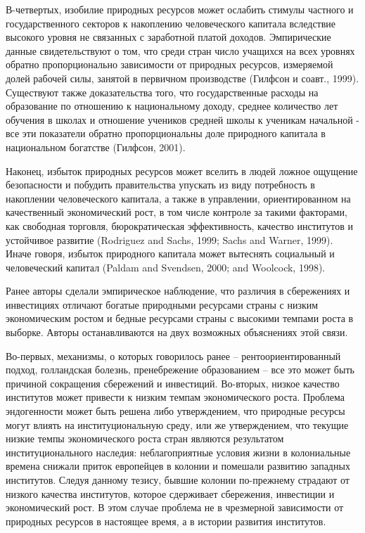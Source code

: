 \documentclass[12pt,a4paper, oneside]{extreport}
\begin{document}
В-четвертых, изобилие природных ресурсов может ослабить стимулы частного и государственного секторов к накоплению человеческого капитала вследствие высокого уровня не связанных с заработной платой доходов. Эмпирические данные свидетельствуют о том, что среди стран число учащихся на всех уровнях обратно пропорционально зависимости от природных ресурсов, измеряемой долей рабочей силы, занятой в первичном производстве (Гилфсон и соавт., 1999). Существуют также доказательства того, что государственные расходы на образование по отношению к национальному доходу, среднее количество лет обучения в школах и отношение учеников средней школы к ученикам начальной - все эти показатели обратно пропорциональны доле природного капитала в национальном богатстве (Гилфсон, 2001). 

Наконец, избыток природных ресурсов может вселить в людей ложное ощущение безопасности и побудить правительства упускать из виду потребность в накоплении человеческого капитала, а также в управлении, ориентированном на качественный экономический рост, в том числе контроле за такими факторами, как свободная торговля, бюрократическая эффективность, качество институтов и устойчивое развитие (Rodriguez and Sachs, 1999; Sachs and Warner, 1999). Иначе говоря, избыток природного капитала может вытеснять социальный и человеческий капитал (Paldam and Svendsen, 2000; and Woolcock, 1998). 

Ранее авторы сделали эмпирическое наблюдение, что различия в сбережениях и инвестициях отличают богатые природными ресурсами страны с низким экономическим ростом и бедные ресурсами страны с высокими темпами роста в выборке. Авторы останавливаются на двух возможных объяснениях этой связи. 

Во-первых, механизмы, о которых говорилось ранее – рентоориентированный подход, голландская болезнь, пренебрежение образованием – все это может быть причиной сокращения сбережений и инвестиций. Во-вторых, низкое качество институтов может привести к низким темпам экономического роста. Проблема эндогенности может быть решена либо утверждением, что природные ресурсы могут влиять на институциональную среду, или же утверждением, что текущие низкие темпы экономического роста стран являются результатом институционального наследия: неблагоприятные условия жизни в колониальные времена снижали приток европейцев в колонии и помешали развитию западных институтов. Следуя данному тезису, бывшие колонии по-прежнему страдают от низкого качества институтов, которое сдерживает сбережения, инвестиции и экономический рост. В этом случае проблема не в чрезмерной зависимости от природных ресурсов в настоящее время, а в истории развития институтов. 
\end{document}
